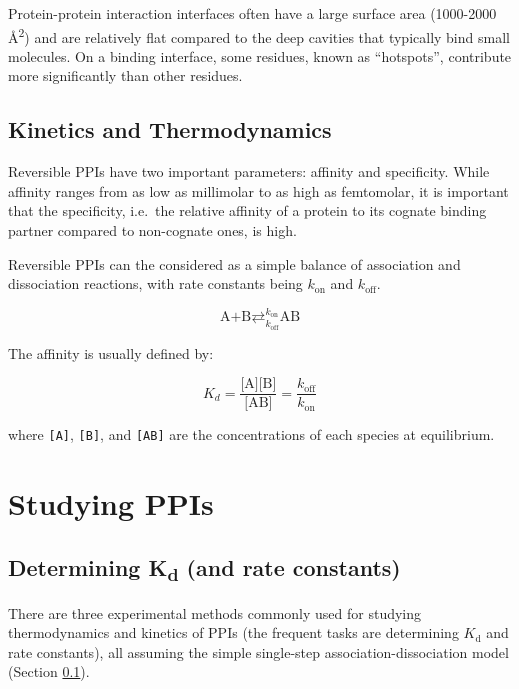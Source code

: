\documentclass[
]{article}
\begin{document}
Protein-protein interaction interfaces often have a large surface area (1000-2000 Å\textsuperscript{2}) and are relatively flat compared to the deep cavities that typically bind small molecules.
On a binding interface, some residues, known as ``hotspots'', contribute more significantly than other residues.

\hypertarget{kd}{%
\subsection{Kinetics and Thermodynamics}\label{kd}}

Reversible PPIs have two important parameters: affinity and specificity. While affinity ranges from as low as millimolar to as high as femtomolar, it is important that the specificity, i.e.~the relative affinity of a protein to its cognate binding partner compared to non-cognate ones, is high.

Reversible PPIs can the considered as a simple balance of association and dissociation reactions, with rate constants being \(k_{\text{on}}\) and \(k_{\text{off}}\).

\[
\text{A+B}\mathrel{\mathop{\rightleftarrows}^{k_{\text{on}}}_{k_{\text{off}}}} \text{AB}
\]

The affinity is usually defined by:

\[
K_d = \dfrac{\text{[A][B]}}{\text{[AB]}} = \dfrac{k_{\text{off}}}{k_{\text{on}}}
\]

where \texttt{{[}A{]}}, \texttt{{[}B{]}}, and \texttt{{[}AB{]}} are the concentrations of each species at equilibrium.

\hypertarget{studying-ppis}{%
\section{Studying PPIs}\label{studying-ppis}}

\hypertarget{determine-kd}{%
\subsection{\texorpdfstring{Determining K\textsubscript{d} (and rate constants)}{Determining Kd (and rate constants)}}\label{determine-kd}}

There are three experimental methods commonly used for studying thermodynamics and kinetics of PPIs (the frequent tasks are determining \(K_\text{d}\) and rate constants), all assuming the simple single-step association-dissociation model (Section \ref{kd}).
\end{document}
